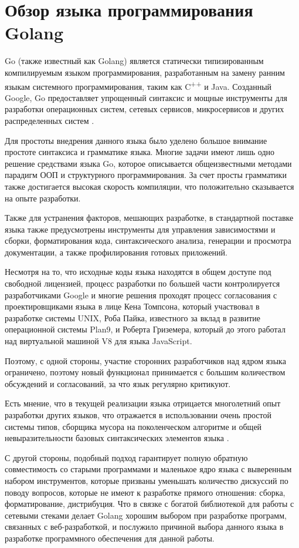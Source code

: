 \section{Обзор языка программирования Golang }
Go (также известный как Golang) является статически типизированным компилируемым языком программирования, разработанным на замену ранним языкам системного программирования, таким как C\textsuperscript{++} и Java. 
Созданный Google, Go предоставляет упрощенный синтаксис и мощные инструменты для разработки операционных систем, сетевых сервисов, микросервисов и других распределенных систем \cite{golang}.

Для простоты внедрения данного языка было уделено большое внимание простоте синтаксиса и грамматике языка. 
Многие задачи имеют лишь одно решение средствами языка Go, которое описывается общеизвестными методами парадигм ООП и структурного программирования. 
За счет просты грамматики также достигается высокая скорость компиляции, что положительно сказывается на опыте разработки.

Также для устранения факторов, мешающих разработке, в стандартной поставке языка также предусмотрены инструменты для управления зависимостями и сборки, форматирования кода, синтаксического анализа, генерации и просмотра документации, а также профилирования готовых приложений.

Несмотря на то, что исходные коды языка находятся в общем доступе под свободной лицензией,
процесс разработки по большей части контролируется разработчиками Google и многие решения проходят процесс согласования с проектировщиками языка в лице Кена Томпсона, который участвовал в разработке системы UNIX, Роба Пайка, известного за вклад в развитие операционной системы Plan9, и Роберта Гриземера, который до этого работал над виртуальной машиной V8 для языка JavaScript.

Поэтому, с одной стороны, участие сторонних разработчиков над ядром языка ограничено, поэтому новый функционал принимается с большим количеством обсуждений и согласований, за что язык регулярно критикуют.

Есть мнение, что в текущей реализации языка отрицается многолетний опыт разработки других языков, что отражается в использовании очень простой системы типов, сборщика мусора на поколенческом алгоритме и общей невыразительности базовых синтаксических элементов языка .

С другой стороны, подобный подход гарантирует полную обратную совместимость со старыми программами и маленькое ядро языка с выверенным набором инструментов, которые призваны уменьшать количество дискуссий по поводу вопросов, которые не имеют к разработке прямого отношения: сборка, форматирование, дистрибуция. Что в связке с богатой библиотекой для работы с сетевыми стеками делает Golang хорошим выбором при разработке программ, связанных с веб-разработкой, и послужило причиной выбора данного языка в разработке программного обеспечения для данной работы.

